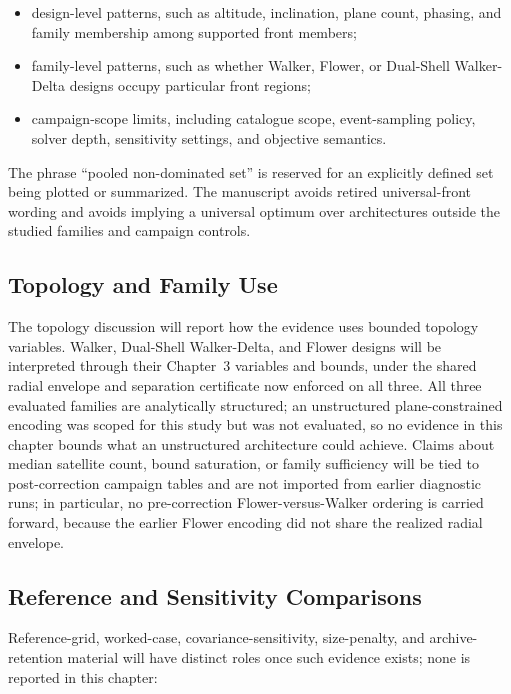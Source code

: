 \begin{itemize}[leftmargin=*]
    \item design-level patterns, such as altitude, inclination, plane count, phasing, and family membership among supported front members;
    \item family-level patterns, such as whether Walker, Flower, or Dual-Shell Walker-Delta designs occupy particular front regions;
    \item campaign-scope limits, including catalogue scope, event-sampling policy, solver depth, sensitivity settings, and objective semantics.
\end{itemize}

The phrase ``pooled non-dominated set'' is reserved for an explicitly defined set being plotted or summarized. The manuscript avoids retired universal-front wording and avoids implying a universal optimum over architectures outside the studied families and campaign controls.

\subsection{Topology and Family Use} \label{se:topology_selection}

The topology discussion will report how the evidence uses bounded topology variables. Walker, Dual-Shell Walker-Delta, and Flower designs will be interpreted through their Chapter~3 variables and bounds, under the shared radial envelope and separation certificate now enforced on all three. All three evaluated families are analytically structured; an unstructured plane-constrained encoding was scoped for this study but was not evaluated, so no evidence in this chapter bounds what an unstructured architecture could achieve. Claims about median satellite count, bound saturation, or family sufficiency will be tied to post-correction campaign tables and are not imported from earlier diagnostic runs; in particular, no pre-correction Flower-versus-Walker ordering is carried forward, because the earlier Flower encoding did not share the realized radial envelope.

\subsection{Reference and Sensitivity Comparisons} \label{se:result_sensitivity_slots}

Reference-grid, worked-case, covariance-sensitivity, size-penalty, and archive-retention material will have distinct roles once such evidence exists; none is reported in this chapter:

